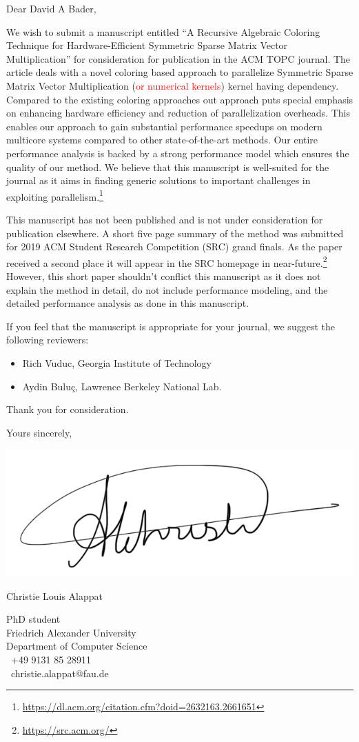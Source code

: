 \documentclass[english,10pt]{ethbrief3}
\date{June 01, 2019} %
\newcommand*{\marvosymbol}[1]{{\fontfamily{mvs}\fontencoding{U}\fontseries{m}\fontshape{n}\selectfont\char#1}}
\begin{document}

\opening{Dear David A Bader, }
We wish to submit a manuscript entitled ``A Recursive Algebraic Coloring Technique for
Hardware-Efficient Symmetric Sparse Matrix Vector Multiplication'' for consideration for
publication in the ACM TOPC journal. The article deals with a novel coloring based approach to 
parallelize Symmetric Sparse Matrix Vector Multiplication (\textcolor{red}{or numerical kernels}) 
kernel having dependency.  Compared to the existing coloring approaches out approach puts 
special emphasis on enhancing hardware efficiency and reduction of parallelization overheads.
This enables our approach to gain substantial performance speedups on modern multicore systems
compared to other state-of-the-art methods. Our entire performance analysis is backed by a strong 
performance model which ensures the quality of our method.
We believe that this manuscript is well-suited for the journal as it aims in finding
generic solutions to important challenges in exploiting parallelism.\footnote{\href{https://dl.acm.org/citation.cfm?doid=2632163.2661651}{https://dl.acm.org/citation.cfm?doid=2632163.2661651}}

This manuscript has not been published and is not under consideration for publication elsewhere.
A short five page summary of the method was submitted for 2019 ACM Student Research Competition (SRC) grand finals. 
As the paper received a second place it will appear in the SRC homepage in near-future.\footnote{\href{https://src.acm.org/}{https://src.acm.org/}}
 However, this short paper shouldn't conflict this manuscript as it does not explain
the method in detail, do not include performance modeling, and the detailed performance analysis
as done in this manuscript.

If you feel that the manuscript is appropriate for your journal, we suggest the following
reviewers:
\begin{itemize}
	\item Rich Vuduc, Georgia Institute of Technology
	\item Aydin Buluç, Lawrence Berkeley National Lab.
\end{itemize}

Thank you for consideration.

\closing{Yours sincerely,}

\vspace{-2.7cm}

\includegraphics[width=0.28\linewidth]{signature_alappat_christie.png}

Christie Louis Alappat

PhD student\\
Friedrich Alexander University\\
Department of Computer Science\\ 
\marvosymbol{72}~+49 9131 85 28911\\
\marvosymbol{66}~christie.alappat@fau.de\\
\end{document}
